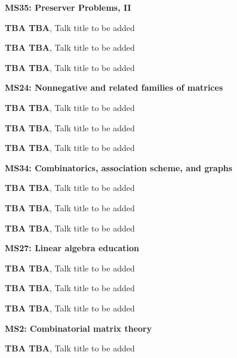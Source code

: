 \documentclass[ILAS2025-program.tex]{subfiles}
\begin{document}
\begin{description}
\begin{description}
    \item[] \textbf{MS35: Preserver Problems, II} 
    \item[] \textbf{TBA TBA}, Talk title to be added
        \item[] \textbf{TBA TBA}, Talk title to be added
        \item[] \textbf{TBA TBA}, Talk title to be added
        \end{description}
    \begin{description}
    \item[] \textbf{MS24: Nonnegative and related families of matrices} 
    \item[] \textbf{TBA TBA}, Talk title to be added
        \item[] \textbf{TBA TBA}, Talk title to be added
        \item[] \textbf{TBA TBA}, Talk title to be added
        \end{description}
    \begin{description}
    \item[] \textbf{MS34: Combinatorics, association scheme, and graphs} 
    \item[] \textbf{TBA TBA}, Talk title to be added
        \item[] \textbf{TBA TBA}, Talk title to be added
        \item[] \textbf{TBA TBA}, Talk title to be added
        \end{description}
    \begin{description}
    \item[] \textbf{MS27: Linear algebra education} 
    \item[] \textbf{TBA TBA}, Talk title to be added
        \item[] \textbf{TBA TBA}, Talk title to be added
        \item[] \textbf{TBA TBA}, Talk title to be added
        \end{description}
    \begin{description}
    \item[] \textbf{MS2: Combinatorial matrix theory} 
    \item[] \textbf{TBA TBA}, Talk title to be added

\end{description}
\end{description}
\end{document}
